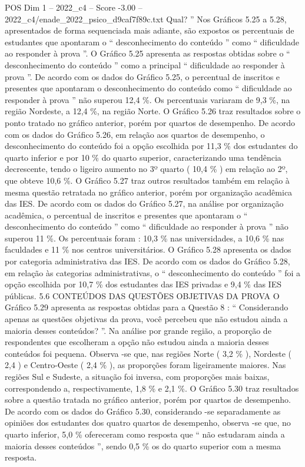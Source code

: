 \begin{textsample}{POS Dim 1 – 2022\_c4 – Score -3.00 – 2022\_c4/enade\_2022\_psico\_d9caf7f89c.txt}
Qual? ” Nos Gráficos 5.25 a 5.28, apresentados de forma sequenciada mais adiante, são expostos os percentuais de estudantes que apontaram o “ desconhecimento do conteúdo ” como “ dificuldade ao responder à prova ”.
O Gráfico 5.25 apresenta as respostas obtidas sobre o “ desconhecimento do conteúdo ” como a principal “ dificuldade ao responder à prova ”.
De acordo com os dados do Gráfico 5.25, o percentual de inscritos e presentes que apontaram o desconhecimento do conteúdo como “ dificuldade ao responder à prova ” não superou 12,4 \%.
Os percentuais variaram de 9,3 \%, na região Nordeste, a 12,4 \%, na região Norte.
O Gráfico 5.26 traz resultados sobre o ponto tratado no gráfico anterior, porém por quartos de desempenho.
De acordo com os dados do Gráfico 5.26, em relação aos quartos de desempenho, o desconhecimento do conteúdo foi a opção escolhida por 11,3 \% dos estudantes do quarto inferior e por 10 \% do quarto superior, caracterizando uma tendência decrescente, tendo o ligeiro aumento no 3º quarto ( 10,4 \% ) em relação ao 2º, que obteve 10,6 \%.
O Gráfico 5.27 traz outros resultados também em relação à mesma questão retratada no gráfico anterior, porém por organização acadêmica das IES.
De acordo com os dados do Gráfico 5.27, na análise por organização acadêmica, o percentual de inscritos e presentes que apontaram o “ desconhecimento do conteúdo ” como “ dificuldade ao responder à prova ” não superou 11 \%.
Os percentuais foram : 10,3 \% nas universidades, a 10,6 \% nas faculdades e 11 \% nos centros universitários.
O Gráfico 5.28 apresenta os dados por categoria administrativa das IES.
De acordo com os dados do Gráfico 5.28, em relação às categorias administrativas, o “ desconhecimento do conteúdo ” foi a opção escolhida por 10,7 \% dos estudantes das IES privadas e 9,4 \% das IES públicas. 5.6 CONTEÚDOS DAS QUESTÕES OBJETIVAS DA PROVA O Gráfico 5.29 apresenta as respostas obtidas para a Questão 8 : “ Considerando apenas as questões objetivas da prova, você percebeu que não estudou ainda a maioria desses conteúdos? ”.
Na análise por grande região, a proporção de respondentes que escolheram a opção não estudou ainda a maioria desses conteúdos foi pequena.
Observa -se que, nas regiões Norte ( 3,2 \% ), Nordeste ( 2,4 ) e Centro-Oeste ( 2,4 \% ), as proporções foram ligeiramente maiores.
Nas regiões Sul e Sudeste, a situação foi inversa, com proporções mais baixas, correspondendo a, respectivamente, 1,8 \% e 2,1 \%.
O Gráfico 5.30 traz resultados sobre a questão tratada no gráfico anterior, porém por quartos de desempenho.
De acordo com os dados do Gráfico 5.30, considerando -se separadamente as opiniões dos estudantes dos quatro quartos de desempenho, observa -se que, no quarto inferior, 5,0 \% ofereceram como resposta que “ não estudaram ainda a maioria desses conteúdos ”, sendo 0,5 \% os do quarto superior com a mesma resposta.

\end{textsample}
